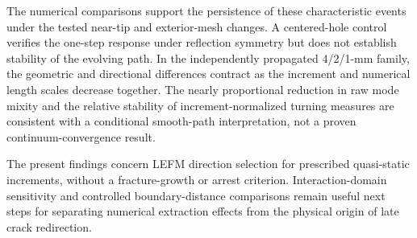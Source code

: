 \documentclass[11pt]{article}
\begin{document}
The numerical comparisons support the persistence of
these characteristic events under the tested
near-tip and exterior-mesh changes. A centered-hole
control verifies the one-step response under reflection
symmetry but does not establish stability of the
evolving path. In the independently propagated
4/2/1-mm family, the geometric and directional
differences contract as the increment and numerical
length scales decrease together. The nearly
proportional reduction in raw mode mixity and the
relative stability of increment-normalized turning
measures are consistent with a conditional smooth-path
interpretation, not a proven continuum-convergence
result.

The present findings concern LEFM direction selection
for prescribed quasi-static increments, without a
fracture-growth or arrest criterion. Interaction-domain
sensitivity and controlled boundary-distance
comparisons remain useful next steps for separating
numerical extraction effects from the physical origin
of late crack redirection.

\FloatBarrier
\appendix
\end{document}

